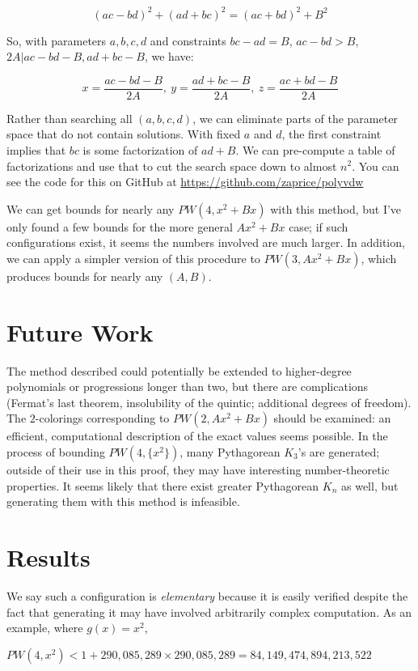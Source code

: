 \documentclass[a4paper]{amsproc}
\theoremstyle{plain}
\begin{document}
$$(ac-bd)^2 + (ad+bc)^2 = (ac+bd)^2 + B^2$$

So, with parameters $a,b,c,d$ and constraints $bc-ad=B$, $ac-bd> B$, ${2A\vert ac-bd-B}, ad+bc-B$, we have:

$$x = \frac{ac-bd-B}{2A},\ y = \frac{ad+bc-B}{2A},\ z = \frac{ac+bd-B}{2A}$$

Rather than searching all $(a,b,c,d)$, we can eliminate parts of the parameter space that do not contain solutions.
With fixed $a$ and $d$, the first constraint implies that $bc$ is some factorization of $ad + B$.
We can pre-compute a table of factorizations and use that to cut the search space down to almost $n^2$.
You can see the code for this on GitHub at \url{https://github.com/zaprice/polyvdw}

We can get bounds for nearly any $PW(4,x^2+Bx)$ with this method,
but I've only found a few bounds for the more general $Ax^2+Bx$ case;
if such configurations exist, it seems the numbers involved are much larger.
In addition, we can apply a simpler version of this procedure to $PW(3,Ax^2+Bx)$,
which produces bounds for nearly any $(A, B)$.

\section{Future Work}

The method described could potentially be extended to higher-degree polynomials or progressions longer than two, but there are complications
(Fermat's last theorem, insolubility of the quintic; additional degrees of freedom).
The $2$-colorings corresponding to $PW(2,Ax^2+Bx)$ should be examined: an efficient, computational description of the exact values seems possible.
In the process of bounding $PW(4, \{x^2\})$, many Pythagorean $K_3$'s are generated;
outside of their use in this proof, they may have interesting number-theoretic properties.
It seems likely that there exist greater Pythagorean $K_n$ as well, but generating them with this method is infeasible.

\section{Results}

We say such a configuration is \textit{elementary} because it is easily verified despite the fact that generating it may have involved arbitrarily complex computation.
As an example, where $g(x)=x^2$,

$ PW(4, x^2) < 1+290{,}085{,}289\times 290{,}085{,}289 = 84{,}149{,}474{,}894{,}213{,}522$
\end{document}
